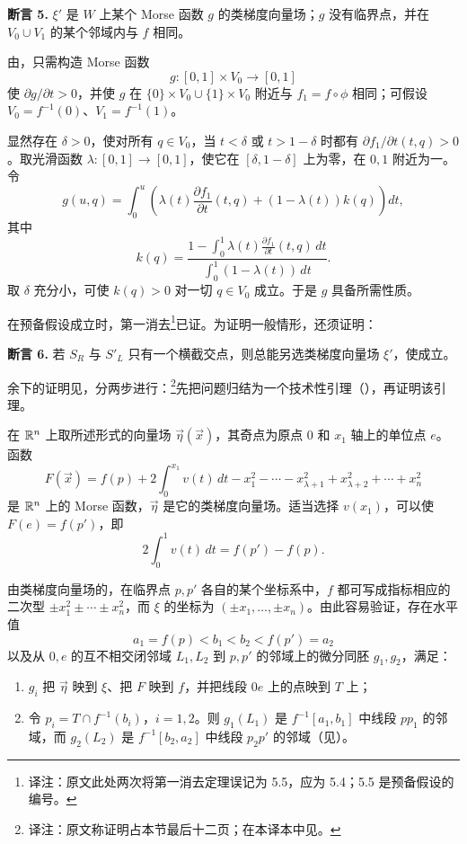 \par\medskip\noindent{}\label{claim:5.5}\textbf{断言 5.}\quad\label{sec5:page54}
$\xi'$ 是 $W$ 上某个 Morse 函数 $g$ 的类梯度向量场；$g$ 没有临界点，并在 $V_0\cup V_1$ 的某个邻域内与 $f$ 相同。

\Proof 由，只需构造 Morse 函数
\[
  g:[0,1]\times V_0\longrightarrow[0,1]
\]
使 $\partial g/\partial t>0$，并使 $g$ 在
$\{0\}\times V_0\cup\{1\}\times V_0$ 附近与 $f_1=f\circ\phi$ 相同；可假设 $V_0=f^{-1}(0)$、$V_1=f^{-1}(1)$。

显然存在 $\delta>0$，使对所有 $q\in V_0$，当 $t<\delta$ 或 $t>1-\delta$ 时都有 $\partial f_1/\partial t(t,q)>0$。取光滑函数 $\lambda:[0,1]\to[0,1]$，使它在 $[\delta,1-\delta]$ 上为零，在 $0,1$ 附近为一。令
\[
  g(u,q)=\int_0^u
  \left(
    \lambda(t)\frac{\partial f_1}{\partial t}(t,q)
    +(1-\lambda(t))k(q)
  \right)dt,
\]
其中
\[
  k(q)=
  \frac{
    1-\displaystyle\int_0^1
      \lambda(t)\frac{\partial f_1}{\partial t}(t,q)\,dt
  }{
    \displaystyle\int_0^1(1-\lambda(t))\,dt
  }.
\]
取 $\delta$ 充分小，可使 $k(q)>0$ 对一切 $q\in V_0$ 成立。于是 $g$ 具备所需性质。
\EndProof

\label{proof:5-4-local-end}在预备假设成立时，第一消去\footnote{译注：原文此处两次将第一消去定理误记为 5.5，应为 5.4；5.5 是预备假设的编号。}已证。为证明一般情形，还须证明：

\par\medskip\noindent{}\label{claim:5.6}\textbf{断言 6.}\quad\label{assertion:5-6-page55}
若 $S_R$ 与 $S'_L$ 只有一个横截交点，则总能另选类梯度向量场 $\xi'$，使成立。

\Remark 余下的证明见，分两步进行：\footnote{译注：原文称证明占本节最后十二页；在本译本中见。}先把问题归结为一个技术性引理（），再证明该引理。

\Proof 在 $\mathbb{R}^n$ 上取所述形式的向量场 $\vec\eta(\vec x)$，其奇点为原点 $0$ 和 $x_1$ 轴上的单位点 $e$。函数
\[
  F(\vec x)=f(p)+2\int_0^{x_1}v(t)\,dt
  -x_1^2-\cdots-x_{\lambda+1}^2
  +x_{\lambda+2}^2+\cdots+x_n^2
\]
是 $\mathbb{R}^n$ 上的 Morse 函数，$\vec\eta$ 是它的类梯度向量场。适当选择 $v(x_1)$，可以使 $F(e)=f(p')$，即
\[
  2\int_0^1v(t)\,dt=f(p')-f(p).
\]

由类梯度向量场的，在临界点 $p,p'$ 各自的某个坐标系中，$f$ 都可写成指标相应的二次型 $\pm x_1^2\pm\cdots\pm x_n^2$，而 $\xi$ 的坐标为 $(\pm x_1,\ldots,\pm x_n)$。由此容易验证，存在水平值
\[
  a_1=f(p)<b_1<b_2<f(p')=a_2
\]
以及从 $0,e$ 的互不相交闭邻域 $L_1,L_2$ 到 $p,p'$ 的邻域上的微分同胚 $g_1,g_2$，满足：
\begin{enumerate}[label=(\alph*)]
  \item $g_i$ 把 $\vec\eta$ 映到 $\xi$、把 $F$ 映到 $f$，并把线段 $0e$ 上的点映到 $T$ 上；
  \item 令 $p_i=T\cap f^{-1}(b_i)$，$i=1,2$。则 $g_1(L_1)$ 是 $f^{-1}[a_1,b_1]$ 中线段 $pp_1$ 的邻域，而 $g_2(L_2)$ 是 $f^{-1}[b_2,a_2]$ 中线段 $p_2p'$ 的邻域（见）。
\end{enumerate}


